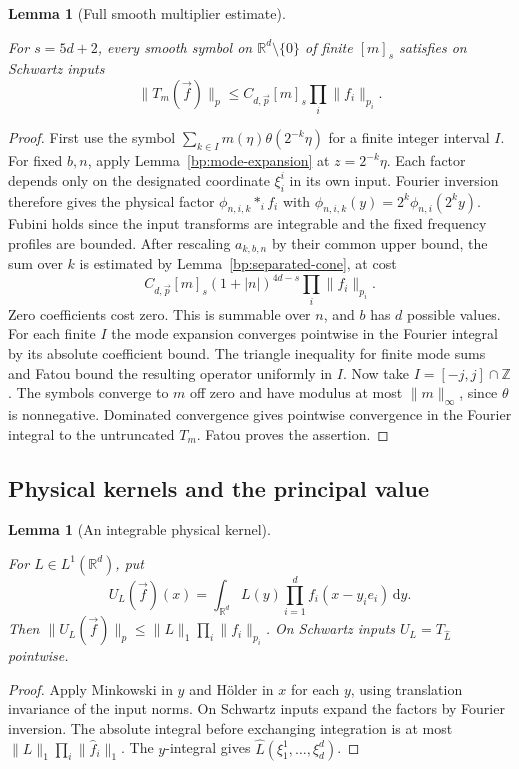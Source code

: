 \documentclass[11pt,letterpaper]{article}
\newtheorem{lemma}[theorem]{Lemma}
\theoremstyle{definition}
\newcommand{\R}{\mathbb R}
\newcommand{\dd}{\,\mathrm d}
\providecommand{\lean}[1]{}
\providecommand{\uses}[1]{}
\begin{document}
\begin{lemma}[Full smooth multiplier estimate]\label{bp:full-multiplier}
\lean{TwistedParaproduct.fullMultiplier}
For \(s=5d+2\), every smooth symbol on \(\R^d\setminus\{0\}\)
of finite \([m]_s\) satisfies on Schwartz inputs
\[
 \|T_m(\vec f)\|_p\le C_{d,\vec p}[m]_s\prod_i\|f_i\|_{p_i}.
\]
\end{lemma}
\begin{proof}
\uses{bp:mode-expansion,bp:separated-cone,bp:schwartz-Fourier,bp:cone-cutoffs}
First use the symbol \(\sum_{k\in I}m(\eta)\theta(2^{-k}\eta)\)
for a finite integer interval \(I\). For fixed \(b,n\), apply
Lemma~\ref{bp:mode-expansion} at \(z=2^{-k}\eta\). Each factor
depends only on the designated coordinate \(\xi_i^i\) in its own
input. Fourier inversion therefore gives the physical factor
\(\phi_{n,i,k}*_i f_i\) with \(\phi_{n,i,k}(y)=
2^k\phi_{n,i}(2^k y)\). Fubini holds since the input transforms are
integrable and the fixed frequency profiles are bounded. After
rescaling \(a_{k,b,n}\) by their common upper bound, the sum over
\(k\) is estimated by Lemma~\ref{bp:separated-cone}, at cost
\[
 C_{d,\vec p}[m]_s(1+|n|)^{4d-s}\prod_i\|f_i\|_{p_i}.
\]
Zero coefficients cost zero. This is summable over \(n\), and \(b\)
has \(d\) possible values. For each finite \(I\) the mode expansion
converges pointwise in the Fourier integral by its absolute
coefficient bound. The triangle inequality for finite mode sums and
Fatou bound the resulting operator uniformly in \(I\).
Now take \(I=[-j,j]\cap\mathbb Z\). The symbols converge to \(m\)
off zero and have modulus at most \(\|m\|_\infty\), since \(\theta\)
is nonnegative. Dominated convergence gives pointwise convergence
in the Fourier integral to the untruncated \(T_m\). Fatou proves
the assertion.
\end{proof}

\subsection{Physical kernels and the principal value}

\begin{lemma}[An integrable physical kernel]\label{bp:physical-integrable}
\lean{TwistedParaproduct.physicalIntegrable}
For \(L\in L^1(\R^d)\), put
\[
 U_L(\vec f)(x)=\int_{\R^d} L(y)\prod_{i=1}^d f_i(x-y_i e_i)\dd y .
\]
Then \(\|U_L(\vec f)\|_p\le\|L\|_1\prod_i\|f_i\|_{p_i}\).
On Schwartz inputs \(U_L=T_{\widehat L}\) pointwise.
\end{lemma}
\begin{proof}
Apply Minkowski in \(y\) and H\"older in \(x\) for each \(y\), using
translation invariance of the input norms. On Schwartz inputs expand
the factors by Fourier inversion. The absolute integral before
exchanging integration is at most \(\|L\|_1\prod_i\|\widehat f_i\|_1\).
The \(y\)-integral gives \(\widehat L(\xi_1^1,\ldots,\xi_d^d)\).
\end{proof}
\end{document}
